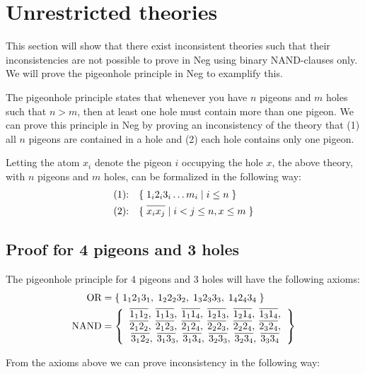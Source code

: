 
\section{Unrestricted theories}
\label{sec:Unrestricted theories}
This section will show that there exist inconsistent theories such that their inconsistencies are not possible to prove in Neg using binary NAND-clauses only.
We will prove the pigeonhole principle in Neg to examplify this.

The pigeonhole principle states that whenever you have $n$ pigeons and $m$ holes such that $n > m$, then at least one hole must contain more than one pigeon.
We can prove this principle in Neg by proving an inconsistency of the theory that (1) all $n$ pigeons are contained in a hole and (2) each hole contains only one pigeon.

Letting the atom $x_i$ denote the pigeon $i$ occupying the hole $x$, the above theory, with $n$ pigeons and $m$ holes, can be formalized in the following way:
\begin{align}
  \text{(1):}\quad &\{ \; 1_i2_i3_i\dots m_i \;|\; i \leq n \; \}\\
  \text{(2):}\quad &\{ \; \ol{x_ix_j} \;|\; i < j \leq n, x \leq m \; \}
\end{align}
\subsection{Proof for 4 pigeons and 3 holes}
\label{sub:Proof for 4 pigeons and 3 holes}
The pigeonhole principle for 4 pigeons and 3 holes will have the following axioms:
\begin{align}
  \text{OR} &= \{ \; 1_12_13_1,\; 1_22_23_2,\; 1_32_33_3,\; 1_42_43_4 \; \} \label{eq:ax1}\\
  \text{NAND} &= \left \{
  \begin{tabular}{c}
    $\ol{1_11_2},\;\ol{1_11_3},\;\ol{1_11_4},\;\ol{1_21_3},\;\ol{1_21_4},\;\ol{1_31_4},$\\
    $\ol{2_12_2},\;\ol{2_12_3},\;\ol{2_12_4},\;\ol{2_22_3},\;\ol{2_22_4},\;\ol{2_32_4},$\\
    $\ol{3_12_2},\;\ol{3_13_3},\;\ol{3_13_4},\;\ol{3_23_3},\;\ol{3_23_4},\;\ol{3_33_4}$
  \end{tabular}
  \right \} \label{eq:ax2}
\end{align}

From the axioms above we can prove inconsistency in the following way:

